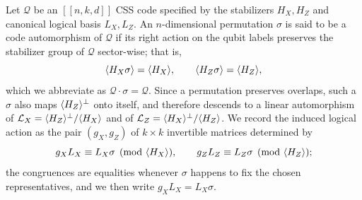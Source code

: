 \begin{definition}\label{def:code-automorphism}
Let $\mathcal{Q}$ be an $[[n,k,d]]$ CSS code specified by the stabilizers $H_X, H_Z$ and canonical logical basis $L_X, L_Z$. An $n$-dimensional permutation $\sigma$ is said to be a code automorphism of $\mathcal{Q}$ if its right action on the qubit labels preserves the stabilizer group of $\mathcal Q$ sector-wise; that is,
\[
\langle H_X\sigma \rangle = \langle H_X \rangle,\qquad \langle H_Z\sigma \rangle = \langle H_Z \rangle,
\]
which we abbreviate as $\mathcal Q\cdot\sigma = \mathcal Q$. Since a permutation preserves overlaps, such a $\sigma$ also maps $\langle H_Z \rangle^\perp$ onto itself, and therefore descends to a linear automorphism of $\mathcal L_X = \langle H_Z \rangle^\perp/\langle H_X \rangle$ and of $\mathcal L_Z = \langle H_X \rangle^\perp/\langle H_Z \rangle$. We record the induced logical action as the pair $(g_X, g_Z)$ of $k\times k$ invertible matrices determined by
\[
g_X L_X \equiv L_X \sigma \pmod{\langle H_X \rangle}, \qquad
g_Z L_Z \equiv L_Z \sigma \pmod{\langle H_Z \rangle};
\]
the congruences are equalities whenever $\sigma$ happens to fix the chosen representatives, and we then write $g_XL_X = L_X\sigma$.
\end{definition}

